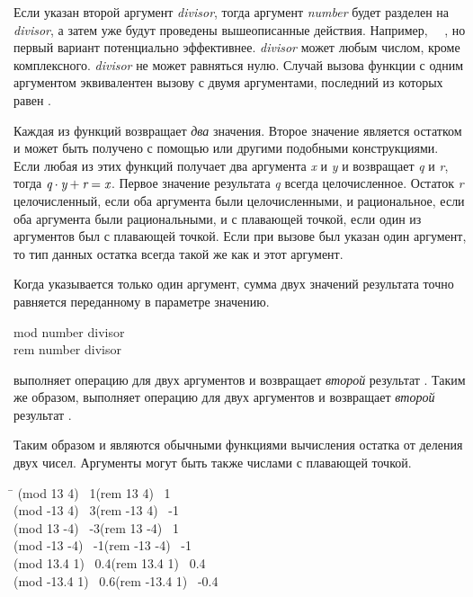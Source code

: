 \begin{defun}[Функция]
Если указан второй аргумент \emph{divisor}, тогда аргумент \emph{number} будет
разделен на \emph{divisor}, а затем уже будут проведены вышеописанные действия.
Например, ~\EQ~, но первый вариант
потенциально эффективнее.
\emph{divisor} может любым числом, кроме комплексного.
\emph{divisor} не может равняться нулю.
Случай вызова функции с одним аргументом эквивалентен вызову с двумя
аргументами, последний из которых равен .

Каждая из функций возвращает \emph{два} значения. Второе значение является
остатком и может быть получено с помощью  или другими
подобными конструкциями.
Если любая из этих функций получает два аргумента \emph{x} и \emph{y} и
возвращает \emph{q} и \emph{r}, тогда  $\emph{q} \cdot
\emph{y}+\emph{r}=\emph{x}$.
Первое значение результата \emph{q} всегда целочисленное.
Остаток \emph{r} целочисленный, если оба аргумента были целочисленными, и
рациональное, если оба аргумента были рациональными,
и с плавающей точкой, если один из аргументов был с плавающей точкой.
Если при вызове был указан один аргумент, то тип данных остатка всегда такой же
как и этот аргумент.

Когда указывается только один аргумент, сумма двух значений результата точно
равняется переданному в параметре значению.
\end{defun}

\begin{defun}[Функция]
mod number divisor \\
rem number divisor

 выполняет операцию  для двух аргументов и возвращает
\emph{второй} результат .
Таким же образом,  выполняет операцию  для двух аргументов и возвращает
\emph{второй} результат .

Таким образом  и  являются обычными функциями вычисления
остатка от деления двух чисел. Аргументы могут быть также числами с плавающей
точкой.
\begin{lisp}
\textwidth\=\kill
(mod 13 4) \EV\ 1\>(rem 13 4) \EV\ 1 \\
(mod -13 4) \EV\ 3\>(rem -13 4) \EV\ -1 \\
(mod 13 -4) \EV\ -3\>(rem 13 -4) \EV\ 1 \\
(mod -13 -4) \EV\ -1\>(rem -13 -4) \EV\ -1 \\
(mod 13.4 1) \EV\ 0.4\>(rem 13.4 1) \EV\ 0.4 \\
(mod -13.4 1) \EV\ 0.6\>(rem -13.4 1) \EV\ -0.4
\end{lisp}
\end{defun}

